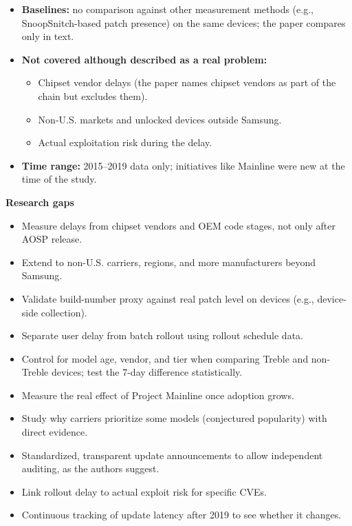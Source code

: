 \documentclass[11pt,a4paper]{article}
\begin{document}
\begin{enumerate}
\begin{itemize}[leftmargin=*, itemsep=1pt, topsep=2pt]
        \item \textbf{Baselines:} no comparison against other measurement methods (e.g., SnoopSnitch-based patch presence) on the same devices; the paper compares only in text.
        \item \textbf{Not covered although described as a real problem:}
        \begin{itemize}[itemsep=0pt]
            \item Chipset vendor delays (the paper names chipset vendors as part of the chain but excludes them).
            \item Non-U.S. markets and unlocked devices outside Samsung.
            \item Actual exploitation risk during the delay.
        \end{itemize}
        \item \textbf{Time range:} 2015--2019 data only; initiatives like Mainline were new at the time of the study.
    \end{itemize}

    \vspace{4pt}
    \textbf{Research gaps}
    \begin{itemize}[leftmargin=*, itemsep=1pt, topsep=2pt]
        \item Measure delays from chipset vendors and OEM code stages, not only after AOSP release.
        \item Extend to non-U.S. carriers, regions, and more manufacturers beyond Samsung.
        \item Validate build-number proxy against real patch level on devices (e.g., device-side collection).
        \item Separate user delay from batch rollout using rollout schedule data.
        \item Control for model age, vendor, and tier when comparing Treble and non-Treble devices; test the 7-day difference statistically.
        \item Measure the real effect of Project Mainline once adoption grows.
        \item Study why carriers prioritize some models (conjectured popularity) with direct evidence.
        \item Standardized, transparent update announcements to allow independent auditing, as the authors suggest.
        \item Link rollout delay to actual exploit risk for specific CVEs.
        \item Continuous tracking of update latency after 2019 to see whether it changes.
    \end{itemize}

\end{enumerate}
\end{document}
